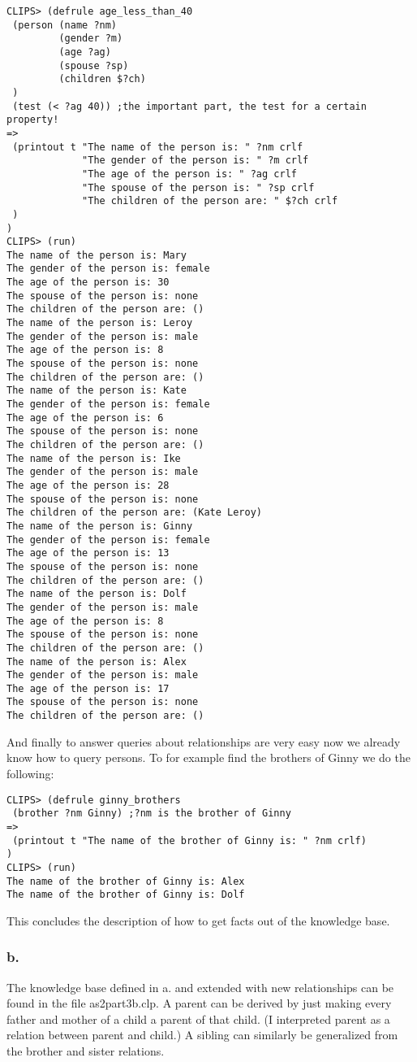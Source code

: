 \documentclass[a4paper]{article}
\begin{document}
\begin{Verbatim}[fontsize=\scriptsize]
CLIPS> (defrule age_less_than_40 
 (person (name ?nm) 
         (gender ?m) 
         (age ?ag) 
         (spouse ?sp) 
         (children $?ch) 
 ) 
 (test (< ?ag 40)) ;the important part, the test for a certain property! 
=>  
 (printout t "The name of the person is: " ?nm crlf 
             "The gender of the person is: " ?m crlf 
             "The age of the person is: " ?ag crlf 
             "The spouse of the person is: " ?sp crlf 
             "The children of the person are: " $?ch crlf 
 ) 
)
CLIPS> (run)
The name of the person is: Mary
The gender of the person is: female
The age of the person is: 30
The spouse of the person is: none
The children of the person are: ()
The name of the person is: Leroy
The gender of the person is: male
The age of the person is: 8
The spouse of the person is: none
The children of the person are: ()
The name of the person is: Kate
The gender of the person is: female
The age of the person is: 6
The spouse of the person is: none
The children of the person are: ()
The name of the person is: Ike
The gender of the person is: male
The age of the person is: 28
The spouse of the person is: none
The children of the person are: (Kate Leroy)
The name of the person is: Ginny
The gender of the person is: female
The age of the person is: 13
The spouse of the person is: none
The children of the person are: ()
The name of the person is: Dolf
The gender of the person is: male
The age of the person is: 8
The spouse of the person is: none
The children of the person are: ()
The name of the person is: Alex
The gender of the person is: male
The age of the person is: 17
The spouse of the person is: none
The children of the person are: ()
\end{Verbatim}
And finally to answer queries about relationships are very easy now we already know how to query persons. To for example find the brothers of Ginny we do the following:

\begin{Verbatim}[fontsize=\scriptsize]
CLIPS> (defrule ginny_brothers  
 (brother ?nm Ginny) ;?nm is the brother of Ginny 
=> 
 (printout t "The name of the brother of Ginny is: " ?nm crlf) 
)
CLIPS> (run)
The name of the brother of Ginny is: Alex
The name of the brother of Ginny is: Dolf
\end{Verbatim}
This concludes the description of how to get facts out of the knowledge base.

\subsubsection*{b.}
The knowledge base defined in a. and extended with new relationships can be found in the file as2part3b.clp. A parent can be derived by just making every father and mother of a child a parent of that child. (I interpreted parent as a relation between parent and child.) A sibling can similarly be generalized from the brother and sister relations. 
\end{document}
